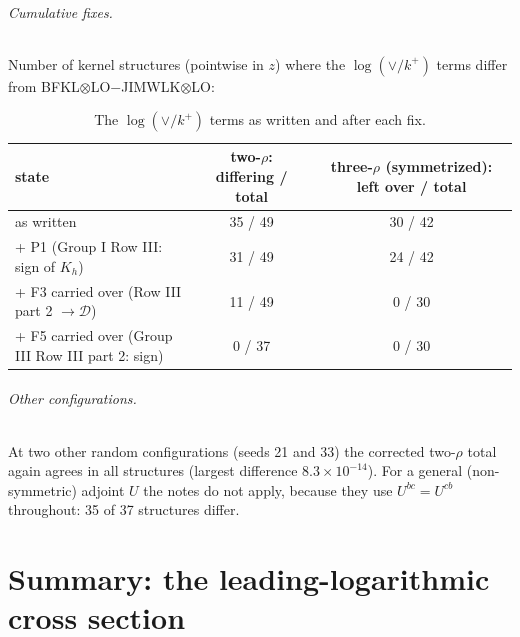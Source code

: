 \documentclass[10pt]{article}
\numberwithin{equation}{section}
\begin{document}
\paragraph{Cumulative fixes.} Number of kernel structures (pointwise in $z$) where the $\log(\vee/k^+)$ terms differ from BFKL$\otimes$LO$-$JIMWLK$\otimes$LO:
\begin{table}[H]
\centering\small
\begin{tabular}{@{}l c c@{}}
state & two-$\rho$: differing / total & three-$\rho$ (symmetrized): left over / total\\ \hline
as written & 35 / 49 & 30 / 42\\
+ P1 (Group I Row III: sign of $K_h$) & 31 / 49 & 24 / 42\\
+ F3 carried over (Row III part 2 $\to\mathcal D$) & 11 / 49 & 0 / 30\\
+ F5 carried over (Group III Row III part 2: sign) & 0 / 37 & 0 / 30\\
\end{tabular}
\caption{The $\log(\vee/k^+)$ terms as written and after each fix.}\label{B:tab:states}
\end{table}

\paragraph{Other configurations.} At two other random configurations (seeds 21 and 33) the corrected two-$\rho$ total again agrees in all structures (largest difference $8.3\times10^{-14}$). For a general (non-symmetric) adjoint $U$ the notes do not apply, because they use $U^{bc}=U^{cb}$ throughout: 35 of 37 structures differ.




\part{Summary: the leading-logarithmic cross section}\label{part:sum}
\end{document}
